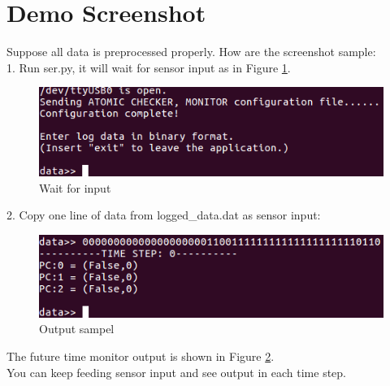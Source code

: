 \documentclass{article}
\theoremstyle{definition}
\begin{document}
 \section{Demo Screenshot}
 Suppose all data is preprocessed properly. How are the screenshot sample:\\
 1. Run \textcolor{purple!30}{ser.py}, it will wait for sensor input as in Figure \ref{step1}.
  \begin{figure}[h]
\caption{Wait for input}
\label{step1}
\includegraphics[width=12cm]{./fig/step1.png}
\centering
\end{figure}

2. Copy one line of data from \textcolor{purple!30}{logged\_data.dat} as sensor input:\\
\begin{figure}[h]
\caption{Output sampel}
\label{step2}
\includegraphics[width=12cm]{./fig/step2.png}
\centering
\end{figure}
The future time monitor output is shown in Figure \ref{step2}.\\

You can keep feeding sensor input and see output in each time step.
\end{document}
